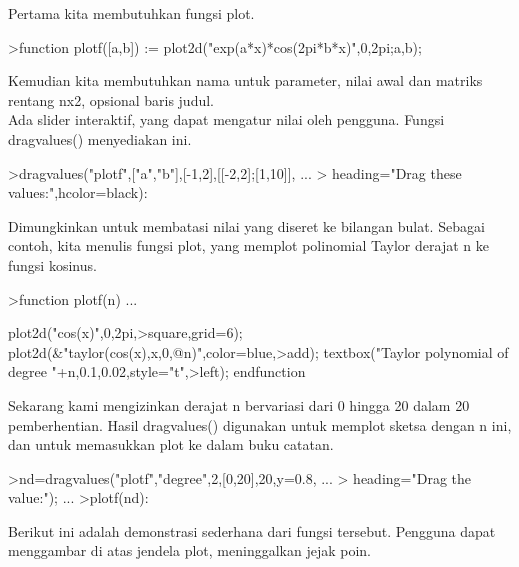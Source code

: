 \documentclass{article}
\begin{document}
\begin{eulernotebook}
\begin{eulercomment}
\begin{eulercomment}
\begin{eulercomment}
\begin{eulercomment}
\begin{eulercomment}
\begin{eulercomment}
\begin{eulercomment}
\begin{eulercomment}
\begin{eulercomment}
\begin{eulercomment}
\begin{eulercomment}
\begin{eulercomment}
\begin{eulercomment}
\begin{eulercomment}
\begin{eulercomment}
\begin{eulercomment}
\begin{eulercomment}
Pertama kita membutuhkan fungsi plot.
\end{eulercomment}
\begin{eulerprompt}
>function plotf([a,b]) := plot2d("exp(a*x)*cos(2pi*b*x)",0,2pi;a,b);
\end{eulerprompt}
\begin{eulercomment}
Kemudian kita membutuhkan nama untuk parameter, nilai awal dan matriks
rentang nx2, opsional baris judul.\\
Ada slider interaktif, yang dapat mengatur nilai oleh pengguna. Fungsi
dragvalues() menyediakan ini.
\end{eulercomment}
\begin{eulerprompt}
>dragvalues("plotf",["a","b"],[-1,2],[[-2,2];[1,10]], ...
>  heading="Drag these values:",hcolor=black):
\end{eulerprompt}
\begin{eulercomment}
Dimungkinkan untuk membatasi nilai yang diseret ke bilangan bulat.
Sebagai contoh, kita menulis fungsi plot, yang memplot polinomial
Taylor derajat n ke fungsi kosinus.
\end{eulercomment}
\begin{eulerprompt}
>function plotf(n) ...
\end{eulerprompt}
\begin{eulerudf}
  plot2d("cos(x)",0,2pi,>square,grid=6);
  plot2d(&"taylor(cos(x),x,0,@n)",color=blue,>add);
  textbox("Taylor polynomial of degree "+n,0.1,0.02,style="t",>left);
  endfunction
\end{eulerudf}
\begin{eulercomment}
Sekarang kami mengizinkan derajat n bervariasi dari 0 hingga 20 dalam
20 pemberhentian. Hasil dragvalues() digunakan untuk memplot sketsa
dengan n ini, dan untuk memasukkan plot ke dalam buku catatan.
\end{eulercomment}
\begin{eulerprompt}
>nd=dragvalues("plotf","degree",2,[0,20],20,y=0.8, ...
>   heading="Drag the value:"); ...
>plotf(nd):
\end{eulerprompt}
\begin{eulercomment}
Berikut ini adalah demonstrasi sederhana dari fungsi tersebut.
Pengguna dapat menggambar di atas jendela plot, meninggalkan jejak
poin.
\end{eulercomment}
\begin{eulerprompt}

\end{eulerprompt}
\end{eulercomment}
\end{eulercomment}
\end{eulercomment}
\end{eulercomment}
\end{eulercomment}
\end{eulercomment}
\end{eulercomment}
\end{eulercomment}
\end{eulercomment}
\end{eulercomment}
\end{eulercomment}
\end{eulercomment}
\end{eulercomment}
\end{eulercomment}
\end{eulercomment}
\end{eulercomment}
\end{eulernotebook}
\end{document}
